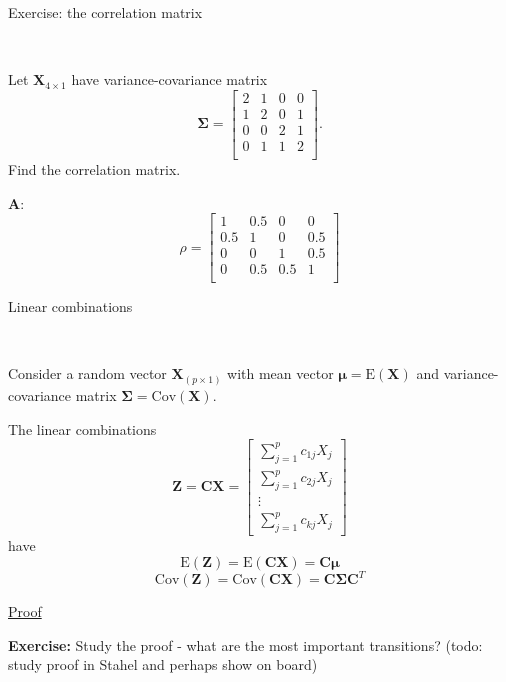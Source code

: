 \documentclass[ignorenonframetext,]{beamer}
\begin{document}
\begin{frame}

\begin{block}{Exercise: the correlation matrix}

\(~\)

Let \(\boldsymbol{X}_{4\times 1}\) have variance-covariance matrix
\[\boldsymbol\Sigma= \left[ \begin{array}{cccc} 2&1&0&0\\
      1&2&0&1\\
      0&0&2&1\\
      0&1&1&2\\
          \end{array}
          \right].\] Find the correlation matrix.

\end{block}

\end{frame}

\begin{frame}

\textbf{A}: \[\rho=\left[ \begin{array}{cccc} 1&0.5&0&0\\
      0.5&1&0&0.5\\
      0&0&1&0.5\\
      0&0.5&0.5&1\\
          \end{array}
          \right]\]

\end{frame}

\begin{frame}

\begin{block}{Linear combinations}

\(~\)

Consider a random vector \(\boldsymbol{X}_{(p\times 1)}\) with mean
vector \(\boldsymbol{\mu}=\text{E}(\boldsymbol{X})\) and
variance-covariance matrix
\(\boldsymbol\Sigma=\text{Cov}(\boldsymbol{X})\).

The linear combinations
\[\boldsymbol{Z}=\boldsymbol{C}\boldsymbol{X}=\left[ \begin{array}{c} \sum_{j=1}^p c_{1j}X_j\\ \sum_{j=1}^p c_{2j}X_j\\ \vdots \\ \sum_{j=1}^p c_{kj}X_j \end{array} \right]\]
have
\[\text{E}(\boldsymbol{Z})=\text{E}(\boldsymbol{C}\boldsymbol{X})=\boldsymbol{C}\boldsymbol{\mu}\]
\[\text{Cov}(\boldsymbol{Z})=\text{Cov}(\boldsymbol{C}\boldsymbol{X})=
   \boldsymbol{C}\boldsymbol\Sigma\boldsymbol{C}^T\]

\href{https://www.math.ntnu.no/emner/TMA4268/2018v/notes/CXproof.pdf}{Proof}

\textbf{Exercise:} Study the proof - what are the most important
transitions? (todo: study proof in Stahel and perhaps show on board)

\end{block}

\end{frame}
\end{document}
